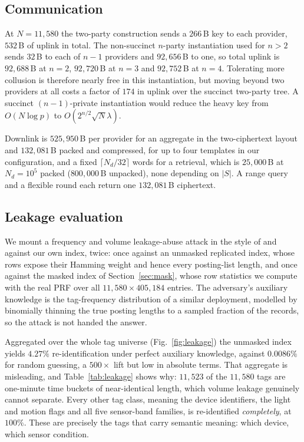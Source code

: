 \documentclass[a4paper,fleqn]{cas-sc}
\begin{document}
\subsection{Communication}
\label{sec:commresult}
At $N=11{,}580$ the two-party construction sends a $266$\,B key to each
provider, $532$\,B of uplink in total. The non-succinct $n$-party
instantiation used for $n>2$ sends $32$\,B to each of $n-1$ providers and
$92{,}656$\,B to one, so total uplink is $92{,}688$\,B at $n=2$,
$92{,}720$\,B at $n=3$ and $92{,}752$\,B at $n=4$. Tolerating more collusion
is therefore nearly free in this instantiation, but moving beyond two
providers at all costs a factor of $174$ in uplink over the succinct two-party
tree. A succinct
$(n{-}1)$-private instantiation would reduce the heavy key from $O(N\log p)$
to $O(2^{n/2}\sqrt{N}\lambda)$.


Downlink is $525{,}950$\,B per provider for an aggregate in the two-ciphertext
layout and $132{,}081$\,B packed and compressed, for up to four templates in
our configuration, and a fixed $\lceil N_d/32\rceil$ words for a retrieval,
which is $25{,}000$\,B at $N_d=10^5$ packed ($800{,}000$\,B unpacked), none
depending on $|S|$. A range query and a flexible round each return one
$132{,}081$\,B ciphertext.

\subsection{Leakage evaluation}
\label{sec:leakeval}
We mount a frequency and volume leakage-abuse attack in the style of
\citet{islam2012access} and \citet{cash2015leakage} against our own index,
twice: once against an unmasked replicated index, whose rows expose their
Hamming weight and hence every posting-list length, and once against the
masked index of Section~\ref{sec:mask}, whose row statistics we compute with
the real PRF over all $11{,}580\times405{,}184$ entries. The adversary's
auxiliary knowledge is the tag-frequency distribution of a similar deployment,
modelled by binomially thinning the true posting lengths to a sampled fraction
of the records, so the attack is not handed the answer.

Aggregated over the whole tag universe (Fig.~\ref{fig:leakage}) the unmasked
index yields $4.27\%$ re-identification under perfect auxiliary knowledge,
against $0.0086\%$ for random guessing, a $500\times$ lift but low in absolute
terms. That aggregate is misleading, and Table~\ref{tab:leakage} shows why:
$11{,}523$ of the $11{,}580$ tags are one-minute time buckets of near-identical
length, which volume leakage genuinely cannot separate. Every other tag class,
meaning the device identifiers, the light and motion flags and all five
sensor-band families, is re-identified \emph{completely}, at $100\%$. These
are precisely the tags that carry semantic meaning: which device, which sensor
condition.
\end{document}
